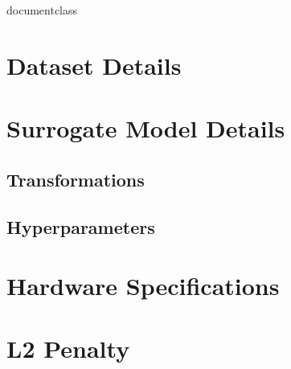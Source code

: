 \csname documentclass

\appendix
\chapter{Dataset Details}\label{appendix:datasets}

\chapter{Surrogate Model Details}

\section{Transformations}\label{appendix:transformations}

\section{Hyperparameters}\label{appendix:surrogate-hyperparameters}

\chapter{Hardware Specifications}


\chapter{L2 Penalty}\label{appendix:l2-penalty}
